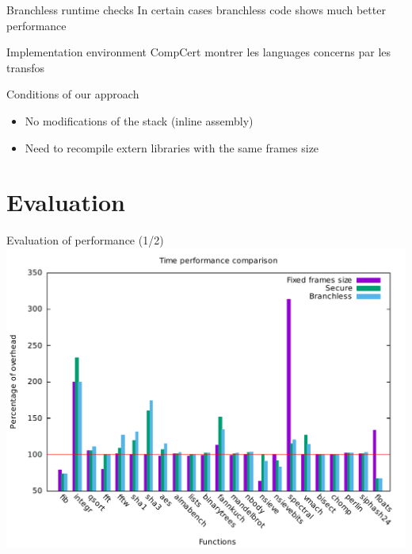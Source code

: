 \documentclass{beamer}
\begin{document}
\begin{frame}{Branchless runtime checks}
	In certain cases  branchless code shows much better performance
	\Branchless
\end{frame}


\begin{frame}[c]{Implementation environment}
	CompCert
	montrer les languages concerns par les transfos
\end{frame}

\begin{frame}[c]{Conditions of our approach}
	\begin{itemize}
		\item No modifications of the stack (inline assembly)
			\Inline
		\item Need to recompile extern libraries with the same frames size
	\end{itemize}
\end{frame}

\section{Evaluation}
\label{sec:Implementation}

\begin{frame}[c]{Evaluation of performance (1/2)}
	\includegraphics[width=\textwidth]{images/time_percentage_graph.pdf}
\end{frame}
\end{document}
